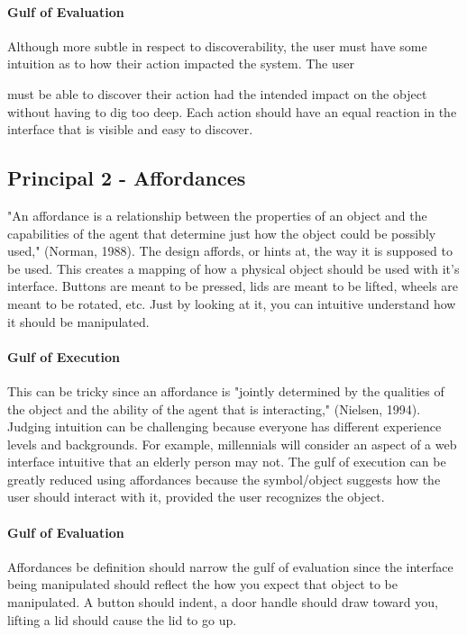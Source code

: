 \paragraph{Gulf of Evaluation}
Although more subtle in respect to discoverability, the user must have some intuition as to how their action impacted the system. The user

\clearpage

must be able to discover their action had the intended impact on the object without having to dig too deep. Each action should have an equal reaction in the interface that is visible and easy to discover.

\subsection{Principal 2 - Affordances}
"An affordance is a relationship between the properties of an object and the capabilities of the agent that determine just how the object could be possibly used," (Norman, 1988). The design affords, or hints at, the way it is supposed to be used. This creates a mapping of how a physical object should be used with it's interface. Buttons are meant to be pressed, lids are meant to be lifted, wheels are meant to be rotated, etc. Just by looking at it, you can intuitive understand how it should be manipulated.

\paragraph{Gulf of Execution}
This can be tricky since an affordance is "jointly determined by the qualities of the object and the ability of the agent that is interacting," (Nielsen, 1994). Judging intuition can be challenging because everyone has different experience levels and backgrounds. For example, millennials will consider an aspect of a web interface intuitive that an elderly person may not. The gulf of execution can be greatly reduced using affordances because the symbol/object suggests how the user should interact with it, provided the user recognizes the object.

\paragraph{Gulf of Evaluation}
Affordances be definition should narrow the gulf of evaluation since the interface being manipulated should reflect the how you expect that object to be manipulated. A button should indent, a door handle should draw toward you, lifting a lid should cause the lid to go up.

